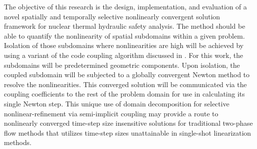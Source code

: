 The objective of this research is the design, implementation, and evaluation of a novel spatially and temporally selective nonlinearly convergent solution framework for nuclear thermal hydraulic safety analysis.
The method should be able to quantify the nonlinearity of spatial subdomains within a given problem.
Isolation of those subdomains where nonlinearities are high will be achieved by using a variant of the code coupling algorithm discussed in .
For this work, the subdomains will be predetermined geometric components.
Upon isolation, the coupled subdomain will be subjected to a globally convergent Newton method to resolve the nonlinearities.
This converged solution will be communicated via the coupling coefficients to the rest of the problem domain for use in calculating its single Newton step.
This unique use of domain decomposition for selective nonlinear-refinement via semi-implicit coupling may provide a route to nonlinearly converged time-step size insensitive solutions for traditional two-phase flow methods that utilizes time-step sizes unattainable in single-shot linearization methods.